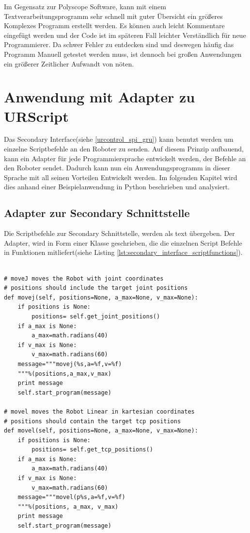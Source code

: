 Im Gegensatz zur Polyscope Software, kann mit einem Textverarbeitungsprogramm sehr schnell mit guter Übersicht ein größeres Komplexes Programm erstellt werden. Es können auch leicht Kommentare eingefügt werden und der Code ist im späteren Fall leichter Verständlich für neue Programmierer. Da schwer Fehler zu entdecken sind und deswegen häufig das Programm Manuell getestet werden muss, ist dennoch bei großen Anwendungen ein größerer Zeitlicher Aufwandt von nöten.

\section{Anwendung mit Adapter zu URScript}
\label{sec:script_hoerherer_schicht_rel}

Das Secondary Interface(siehe \ref{urcontrol_spi_gru}) kann benutzt werden um einzelne Scriptbefehle an den Roboter zu senden. Auf diesem Prinzip aufbauend, kann ein Adapter für jede Programmiersprache entwickelt werden, der Befehle an den Roboter sendet. Dadurch kann nun ein Anwendungsprogramm in dieser Sprache mit all seinen Vorteilen Entwickelt werden. Im folgenden Kapitel wird dies anhand einer Beispielanwendung in Python beschrieben und analysiert.

\subsection{Adapter zur Secondary Schnittstelle}
\label{beschreibung_script_hoeher_schicht}
Die Scriptbefehle zur Secondary Schnittstelle, werden als text übergeben. Der Adapter, wird in Form einer Klasse geschrieben, die die einzelnen Script Befehle in Funktionen mitliefert(siehe Listing \ref{lst:secondary_interface_scriptfunctions}).

\begin{lstlisting}[caption={Ausschnitt zeigt Funktionen die Scriptbefehle in der Adapter Klasse umgesetzt}, label=lst:urscipt_program_lst ,captionpos=b] 

# moveJ moves the Robot with joint coordinates
# positions should include the target joint positions
def movej(self, positions=None, a_max=None, v_max=None):
    if positions is None:
        positions= self.get_joint_positions()
    if a_max is None:
        a_max=math.radians(40)
    if v_max is None:
        v_max=math.radians(60)
    message="""movej(%s,a=%f,v=%f)
    """%(positions,a_max,v_max)
    print message
    self.start_program(message)

# movel moves the Robot Linear in kartesian coordinates
# positions should contain the target tcp positions
def movel(self, positions=None, a_max=None, v_max=None):
    if positions is None:
        positions= self.get_tcp_positions()
    if a_max is None:
        a_max=math.radians(40)
    if v_max is None:
        v_max=math.radians(60)
    message="""movel(p%s,a=%f,v=%f)
    """%(positions, a_max, v_max)
    print message
    self.start_program(message)
\end{lstlisting}

